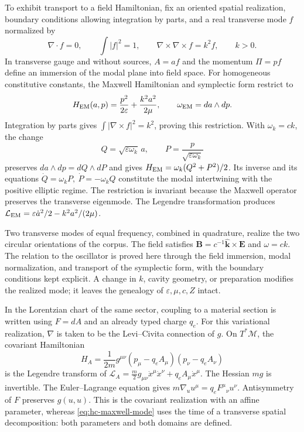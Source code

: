 To exhibit transport to a field Hamiltonian, fix an
oriented spatial realization, boundary conditions allowing
integration by parts, and a real transverse mode \(f\) normalized by
\[
 \nabla\cdot f=0,\qquad \int|f|^2=1,\qquad
 \nabla\times\nabla\times f=k^2f,\qquad k>0.
\]
In transverse gauge and without sources, \(A=af\) and the momentum
\(\Pi=pf\) define an immersion of the modal plane into field
space. For homogeneous constitutive constants, the Maxwell Hamiltonian and
symplectic form restrict to
\begin{equation}
 H_{\rm EM}(a,p)=\frac{p^2}{2\varepsilon}
 +\frac{k^2a^2}{2\mu},\qquad \omega_{\rm EM}=da\wedge dp.
 \label{eq:hc-maxwell-mode}
\end{equation}
Integration by parts gives
\(\int|\nabla\times f|^2=k^2\), proving this restriction.
With \(\omega_k=ck\), the change
\begin{equation}
 Q=\sqrt{\varepsilon\omega_k}\,a,
 \qquad P=\frac{p}{\sqrt{\varepsilon\omega_k}}
 \label{eq:hc-maxwell-symplectic}
\end{equation}
preserves \(da\wedge dp=dQ\wedge dP\) and gives
\(H_{\rm EM}=\omega_k(Q^2+P^2)/2\). Its inverse and its equations
\(\dot Q=\omega_kP,\ \dot P=-\omega_kQ\)
constitute the modal intertwining with the positive elliptic regime.
The restriction is invariant because the Maxwell operator preserves the
transverse eigenmode. The Legendre transformation produces
\(\mathcal L_{\rm EM}=\varepsilon\dot a^2/2-k^2a^2/(2\mu)\).

Two transverse modes of equal frequency, combined in quadrature,
realize the two circular orientations of the corpus. The field satisfies
\(\mathbf B=c^{-1}\widehat{\mathbf k}\times\mathbf E\) and
\(\omega=ck\). The relation to the oscillator is proved here through
the field immersion, modal normalization, and transport of the symplectic
form, with the boundary conditions kept explicit.
A change in \(k\), cavity geometry, or preparation
modifies the realized mode; it leaves the genealogy of
\(\varepsilon,\mu,c,Z\) intact.

In the Lorentzian chart of the same sector, coupling to a material
section is written using \(F=dA\) and an already typed charge \(q_e\).
For this variational realization, \(\nabla\) is taken to be the
Levi--Civita connection of \(g\). On
\(T^*\mathcal M\), the covariant Hamiltonian
\[
 H_A=\frac1{2m}g^{\mu\nu}(p_\mu-q_eA_\mu)(p_\nu-q_eA_\nu)
\]
is the Legendre transform of
\(\mathcal L_A=\frac m2g_{\mu\nu}\dot x^\mu\dot x^\nu
+q_eA_\mu\dot x^\mu\). The Hessian \(mg\) is invertible.
The Euler--Lagrange equation gives
\(m\nabla_u u^\mu=q_eF^\mu{}_{\nu}u^\nu\).
Antisymmetry of \(F\) preserves \(g(u,u)\). This is the
covariant realization with an affine parameter, whereas
\eqref{eq:hc-maxwell-mode} uses the time of a transverse spatial
decomposition: both parameters and both domains are defined.

